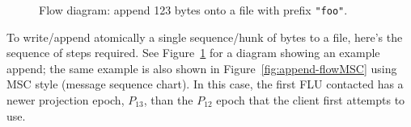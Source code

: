 \documentclass[preprint,10pt]{sigplanconf}
\begin{document}
\begin{figure}[htp]
\caption{Flow diagram: append 123 bytes onto a file with prefix {\tt "foo"}.}
\label{fig:append-flow}
\end{figure}

To write/append atomically a single sequence/hunk of bytes to a file,
here's the sequence of steps required.
See Figure~\ref{fig:append-flow} for a diagram showing an example
append; the same example is also shown in
Figure~\ref{fig:append-flowMSC} using MSC style (message sequence chart).
In
this case, the first FLU contacted has a newer projection epoch,
$P_{13}$, than the $P_{12}$ epoch that the client first attempts to use.
\end{document}
